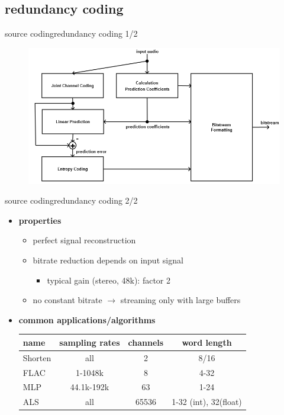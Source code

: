 \subsection{redundancy coding}
	\begin{frame}{source coding}{redundancy coding 1/2}
		\begin{figure}
			\centering
				\includegraphics[scale=0.4]{Graph/redundancycoding}
		\end{figure}
	\end{frame}

	\begin{frame}{source coding}{redundancy coding 2/2}	
		\begin{itemize}
			\item	\textbf{properties}
				\begin{itemize}
					\item	perfect signal reconstruction
					\item	bitrate reduction depends on input signal
						\begin{itemize}
							\item	typical gain (stereo, 48k): factor 2
						\end{itemize}
					\item	no constant bitrate $\rightarrow$ streaming only with large buffers
				\end{itemize}
			\pause
            \bigskip
			\item	\textbf{common applications/algorithms}
			\begin{table}
			\centering
				\begin{footnotesize}
					\begin{tabular}{lccc}
					\hline
						\textbf{name} & \textbf{sampling rates}	& \textbf{channels}	& \textbf{word length} \\
					\hline
					Shorten	& all 			& 2 	& 8/16\\
					FLAC 	& 1-1048k 		& 8 	& 4-32\\
					MLP 	& 44.1k-192k	& 63 	& 1-24\\
					ALS 	& all 			& 65536	& 1-32 (int), 32(float)\\
					\end{tabular}  
				\end{footnotesize}
			\end{table}
		\end{itemize}		
	\end{frame}
